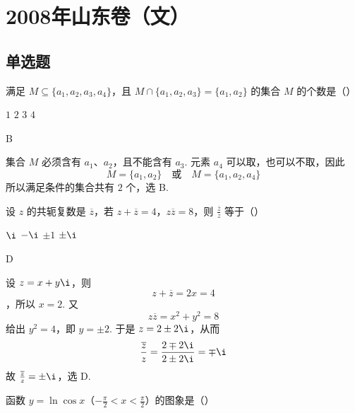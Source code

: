 \chapter{2008年山东卷（文）}

\section{单选题}

\begin{problem}
满足 \(M \subseteq \{a_1, a_2, a_3, a_4\}\)，且 \(M \cap \{a_1, a_2, a_3\} = \{a_1, a_2\}\) 的集合 \(M\) 的个数是（\quad）

\choices
    {\(1\)}
    {\(2\)}
    {\(3\)}
    {\(4\)}
\end{problem}

\begin{answer}
B
\end{answer}

\begin{solution}
集合 \(M\) 必须含有 \(a_1\)、\(a_2\)，且不能含有 \(a_3\). 元素 \(a_4\) 可以取，也可以不取，因此
\[
M=\{a_1,a_2\}\quad\text{或}\quad M=\{a_1,a_2,a_4\}
\]
所以满足条件的集合共有 \(2\) 个，选 B.
\end{solution}

\begin{problem}
设 \(z\) 的共轭复数是 \(\overline{z}\)，若 \(z + \overline{z} = 4\)，\(z\overline{z} = 8\)，则 \(\frac{\overline{z}}{z}\) 等于（\quad）

\choices
    {\(\i\)}
    {\(-\i\)}
    {\(\pm 1\)}
    {\(\pm\i\)}
\end{problem}

\begin{answer}
D
\end{answer}

\begin{solution}
设 \(z=x+y\i\)，则
\[
z+\overline{z}=2x=4
\]
，所以 \(x=2\). 又
\[
z\overline{z}=x^2+y^2=8
\]
给出 \(y^2=4\)，即 \(y=\pm2\). 于是 \(z=2\pm2\i\)，从而
\[
\frac{\overline z}{z}
 =\frac{2\mp2\i}{2\pm2\i}
 =\mp\i
\]
故 \(\frac{\overline z}{z}=\pm\i\)，选 D.
\end{solution}

\begin{problem}
函数 \(y = \ln \cos x\)（\(-\frac{\pi}{2} < x < \frac{\pi}{2}\)）的图象是（\quad）

    {}
    {}
    {}
\end{problem}

